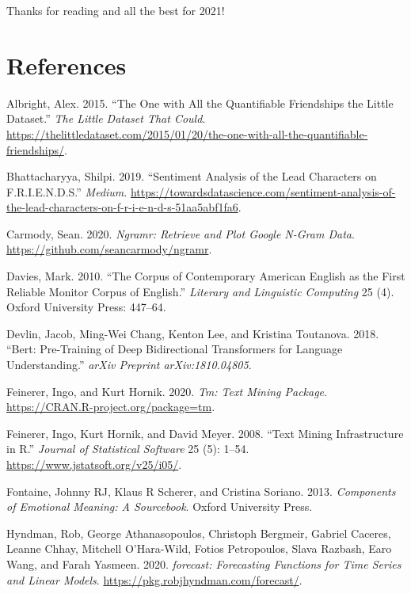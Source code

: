 \documentclass[]{article}
\begin{document}
\vspace{1cm}
{
\Large
Thanks for reading and all the best for 2021!
}
\newpage

\hypertarget{references}{%
\section*{References}\label{references}}

\hypertarget{refs}{}
\leavevmode\hypertarget{ref-Albright2015}{}%
Albright, Alex. 2015. ``The One with All the Quantifiable Friendships the Little Dataset.'' \emph{The Little Dataset That Could}. \url{https://thelittledataset.com/2015/01/20/the-one-with-all-the-quantifiable-friendships/}.

\leavevmode\hypertarget{ref-bhattacharyya_sentiment_2019}{}%
Bhattacharyya, Shilpi. 2019. ``Sentiment Analysis of the Lead Characters on F.R.I.E.N.D.S.'' \emph{Medium}. \url{https://towardsdatascience.com/sentiment-analysis-of-the-lead-characters-on-f-r-i-e-n-d-s-51aa5abf1fa6}.

\leavevmode\hypertarget{ref-ngramr}{}%
Carmody, Sean. 2020. \emph{Ngramr: Retrieve and Plot Google N-Gram Data}. \url{https://github.com/seancarmody/ngramr}.

\leavevmode\hypertarget{ref-davies2010corpus}{}%
Davies, Mark. 2010. ``The Corpus of Contemporary American English as the First Reliable Monitor Corpus of English.'' \emph{Literary and Linguistic Computing} 25 (4). Oxford University Press: 447--64.

\leavevmode\hypertarget{ref-devlin2018bert}{}%
Devlin, Jacob, Ming-Wei Chang, Kenton Lee, and Kristina Toutanova. 2018. ``Bert: Pre-Training of Deep Bidirectional Transformers for Language Understanding.'' \emph{arXiv Preprint arXiv:1810.04805}.

\leavevmode\hypertarget{ref-tm1}{}%
Feinerer, Ingo, and Kurt Hornik. 2020. \emph{Tm: Text Mining Package}. \url{https://CRAN.R-project.org/package=tm}.

\leavevmode\hypertarget{ref-tm2}{}%
Feinerer, Ingo, Kurt Hornik, and David Meyer. 2008. ``Text Mining Infrastructure in R.'' \emph{Journal of Statistical Software} 25 (5): 1--54. \url{https://www.jstatsoft.org/v25/i05/}.

\leavevmode\hypertarget{ref-fontaine2013components}{}%
Fontaine, Johnny RJ, Klaus R Scherer, and Cristina Soriano. 2013. \emph{Components of Emotional Meaning: A Sourcebook}. Oxford University Press.

\leavevmode\hypertarget{ref-forecast1}{}%
Hyndman, Rob, George Athanasopoulos, Christoph Bergmeir, Gabriel Caceres, Leanne Chhay, Mitchell O'Hara-Wild, Fotios Petropoulos, Slava Razbash, Earo Wang, and Farah Yasmeen. 2020. \emph{forecast: Forecasting Functions for Time Series and Linear Models}. \url{https://pkg.robjhyndman.com/forecast/}.
\end{document}

